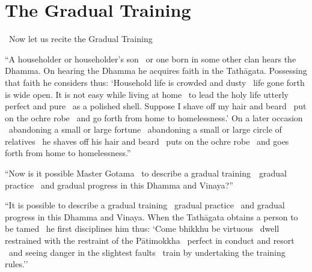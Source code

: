 \section{The Gradual Training}
\label{gradual-training}

\begin{leader-english}
  \anglebracketleft\ \hspace{-0.5mm}Now let us recite the Gradual Training \hspace{-0.5mm}\anglebracketright\
\end{leader-english}
\begin{english-only-justify}
  ``A householder or householder's son \breathmark\ or one born in some other clan hears the Dhamma. On hearing the Dhamma he acquires faith in the Tathāgata. Possessing that faith he considers thus: `Household life is crowded and dusty \breathmark\ life gone forth is wide open. It is not easy while living at home \breathmark\ to lead the holy life utterly perfect and pure \breathmark\ as a polished shell. Suppose I shave off my hair and beard \breathmark\ put on the ochre robe \breathmark\ and go forth from home to homelessness.' On a later occasion \breathmark\ abandoning a small or large fortune \breathmark\ abandoning a small or large circle of relatives \breathmark\ he shaves off his hair and beard \breathmark\ puts on the ochre robe \breathmark\ and goes forth from home to homelessness.''
\end{english-only-justify}

\suttaRef{[MN 27 / 38 / 51]}

\begin{english-only-justify}
  ``Now is it possible Master Gotama \breathmark\ to describe a gradual \mbox{training}~\breathmark\ gradual practice \breathmark\ and gradual progress in this Dhamma and Vinaya?''
\end{english-only-justify}

\begin{english-only-justify}
  ``It is possible to describe a gradual training \breathmark\ gradual practice \breathmark\ and gradual progress in this Dhamma and Vinaya. When the Tathāgata obtains a person to be tamed \breathmark\ he first disciplines him thus: `Come bhikkhu be virtuous \breathmark\ dwell restrained with the restraint of the Pātimokkha \breathmark\ perfect in conduct and resort \breathmark\ and seeing danger in the slightest faults \breathmark\ train by undertaking the training rules.''
\end{english-only-justify}

